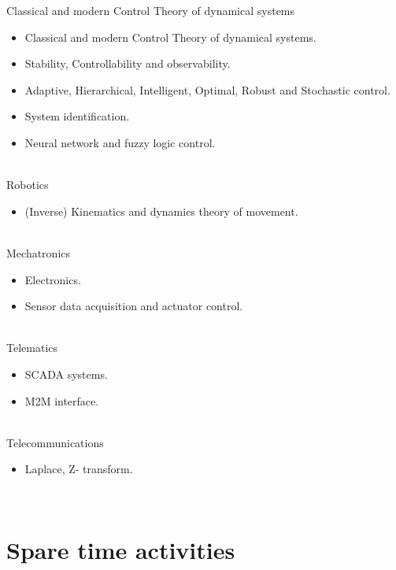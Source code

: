 \documentclass[letterpaper]{engineer_cv} %
\begin{document}
	\begin{longList} %
		\longListItem
			{}
			{}
			{Classical and modern Control Theory of dynamical systems}
			{}
			{}
			{\begin{itemize}
				\item Classical and modern Control Theory of dynamical systems.
				\item Stability, Controllability and observability.
				\item Adaptive, Hierarchical, Intelligent, Optimal, Robust and Stochastic control.
				\item System identification.
				\item Neural network and fuzzy logic control.
			\end{itemize}}
			\\
		\longListItem
			{}
			{}
			{Robotics}
			{}
			{}
			{\begin{itemize}
				\item (Inverse) Kinematics and dynamics theory of movement.
			\end{itemize}}
			\\
		\longListItem
			{}
			{}
			{Mechatronics}
			{}
			{}
			{\begin{itemize}
				\item Electronics.
				\item Sensor data acquisition and actuator control.
			\end{itemize}}
			\\
		\longListItem
			{}
			{}
			{Telematics}
			{}
			{}
			{\begin{itemize}
				\item SCADA systems.
				\item M2M interface.
			\end{itemize}}
			\\
		\longListItem
			{}
			{}
			{Telecommunications}
			{}
			{}
			{\begin{itemize}
				\item Laplace, Z- transform.
			\end{itemize}}
			\\
	\end{longList}


	\section{Spare time activities}
\end{document}
